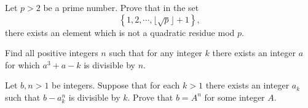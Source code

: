 \documentclass{subfile}
\begin{document}
	\begin{problem} %
		Let $p>2$ be a prime number. Prove that in the set $$\left\{1,2, \cdots ,\lfloor{\sqrt{p}}\rfloor+1\right\},$$ there exists an element which is not a quadratic residue mod $p$.
	\end{problem}


	\begin{problem}[APMO 2014] %
		Find all positive integers $n$ such that for any integer $k$ there exists an integer $a$ for which $a^3+a-k$ is divisible by $n$.
	\end{problem}

	\begin{problem}
		Let $b,n > 1$ be integers. Suppose that for each $k > 1$ there exists an integer $a_k$ such that $b - a^n_k$ is divisible by $k$. Prove that $b = A^n$ for some integer $A$.
	\end{problem}

\end{document}
